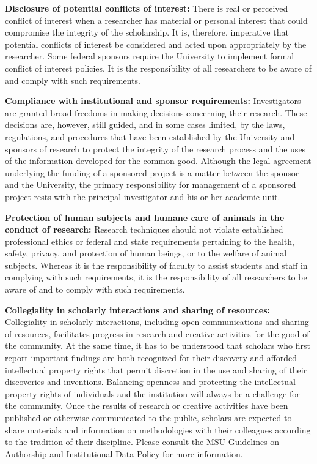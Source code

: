 \textbf{Disclosure of potential conflicts of interest:} There is real
or perceived conflict of interest when a researcher has material or
personal interest that could compromise the integrity of the
scholarship. It is, therefore, imperative that potential conflicts of
interest be considered and acted upon appropriately by the
researcher. Some federal sponsors require the University to implement
formal conflict of interest policies. It is the responsibility of all
researchers to be aware of and comply with such requirements. 

\textbf{Compliance with institutional and sponsor requirements:}
Investigators are granted broad freedoms in making decisions
concerning their research. These decisions are, however, still guided,
and in some cases limited, by the laws, regulations, and procedures
that have been established by the University and sponsors of research
to protect the integrity of the research process and the uses of the
information developed for the common good. Although the legal
agreement underlying the funding of a sponsored project is a matter
between the sponsor and the University, the primary responsibility for
management of a sponsored project rests with the principal
investigator and his or her academic unit. 

\textbf{Protection of human subjects and humane care of animals in the
  conduct of research:} Research techniques should not violate
established professional ethics or federal and state requirements
pertaining to the health, safety, privacy, and protection of human
beings, or to the welfare of animal subjects. Whereas it is the
responsibility of faculty to assist students and staff in complying
with such requirements, it is the responsibility of all researchers to
be aware of and to comply with such requirements. 

\textbf{Collegiality in scholarly interactions and sharing of
  resources:} Collegiality in scholarly interactions, including open
communications and sharing of resources, facilitates progress in
research and creative activities for the good of the community. At the
same time, it has to be understood that scholars who first report
important findings are both recognized for their discovery and
afforded intellectual property rights that permit discretion in the
use and sharing of their discoveries and inventions. Balancing
openness and protecting the intellectual property rights of
individuals and the institution will always be a challenge for the
community. Once the results of research or creative activities have
been published or otherwise communicated to the public, scholars are
expected to share materials and information on methodologies with
their colleagues according to the tradition of their discipline.
Please consult the MSU
\href{http://vprgs.msu.edu/michigan-state-university-guidelines-authorship}{Guidelines
on Authorship} and
\href{https://tech.msu.edu/about/guidelines-policies/msu-institutional-data-policy/}{Institutional
Data Policy} for more information.

